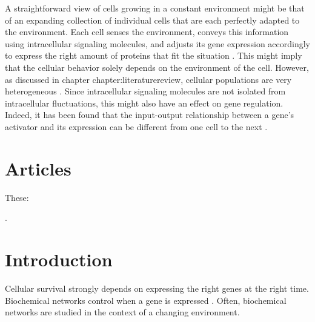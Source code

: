 
A straightforward view of cells growing in a constant environment might be 
that of an expanding collection of individual cells that are each perfectly adapted to the environment.
%
Each cell senses the environment, 
conveys this information using intracellular signaling molecules, 
and adjusts its gene expression accordingly to 
express the right amount of proteins that fit the situation \cite{Bray1995, Alon2006, Alon2007, Tyson2010}.
%
This might imply that the cellular behavior solely depends on the environment of the cell.
%
However, as discussed in chapter {chapter:literaturereview}, cellular populations are very heterogeneous \cite{Kiviet2014, Hashimoto2016}.
%
Since intracellular signaling molecules are not isolated from intracellular fluctuations, 
this might also have an effect on gene regulation.
%
Indeed, it has been found that the input-output relationship between a gene's activator and its expression can be different from one cell to the next \cite{Rosenfeld2005, Keegstra2017}.

\section{Articles}

These: 

\cite{Brandman2008}
\cite{Rosenfeld2007}
\cite{Zambrano2015}
\cite{Howell2012}
\cite{Nevozhay2009}
\cite{Hornung2008}
\cite{Dublanche2006}
\cite{Becskei2000}
\cite{Swain2004}
\cite{Bowsher2013}
\cite{Avery2006}
\cite{Maheshri2007}
\cite{Levine2007a}
\cite{Bennett2008a}
\cite{Smits2006}
\cite{Balazsi2011}
\cite{Raj2008}
\cite{Davidson2008}
\cite{Elowitz2002}
\cite{Bruggeman2009}
\cite{Kitano2004a}
.



\section{Introduction}


Cellular survival strongly depends on expressing the right genes at the right time.
Biochemical networks control when a gene is expressed \cite{Bray1995, Alon2006, Alon2007, Tyson2010}.
%
Often, biochemical networks are studied in the context of a changing environment.
%







